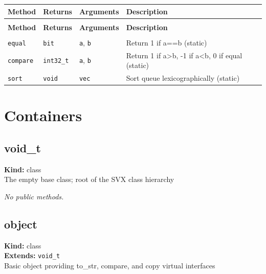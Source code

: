 \documentclass[11pt,letterpaper]{report}
\begin{document}
\begin{xltabular}{\linewidth}{>{\small}p{1.35in} >{\small}p{1.25in} >{\small}p{0.95in} >{\small}X}
\toprule
\textbf{Method} & \textbf{Returns} & \textbf{Arguments} & \textbf{Description} \\
\midrule
\endfirsthead
{} \\
\midrule
\textbf{Method} & \textbf{Returns} & \textbf{Arguments} & \textbf{Description} \\
\midrule
\endhead
\midrule
{} \\
\endfoot
\bottomrule
\endlastfoot
\texttt{equal} & \texttt{bit} & \texttt{a}, \texttt{b} & Return 1 if a==b (static) \\
\texttt{compare} & \texttt{int32\_t} & \texttt{a}, \texttt{b} & Return 1 if a\textgreater{}b, -1 if a\textless{}b, 0 if equal (static) \\
\texttt{sort} & \texttt{void} & \texttt{vec} & Sort queue lexicographically (static) \\
\end{xltabular}

\chapter{Containers}

\section{void\_t}
\label{cls:voidt}

\noindent\textbf{Kind:} class\\
\noindent The empty base class; root of the SVX class hierarchy

\noindent\textit{No public methods.}


\section{object}
\label{cls:object}

\noindent\textbf{Kind:} class\\
\noindent\textbf{Extends:} \texttt{void\_t}\\
\noindent Basic object providing to\_str, compare, and copy virtual interfaces
\end{document}
